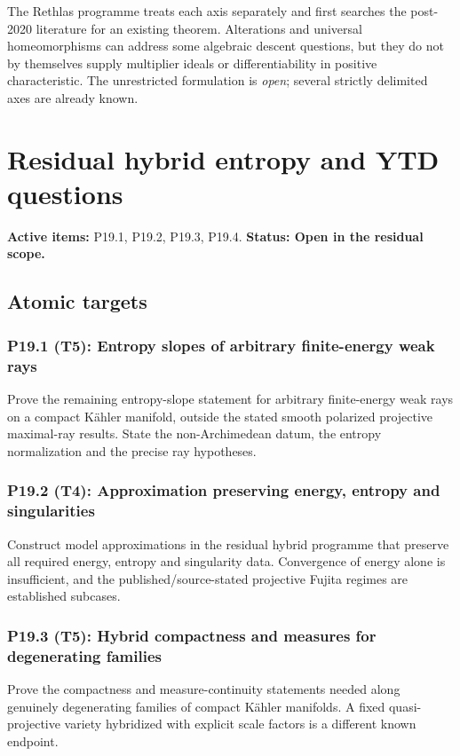 \documentclass[11pt,a4paper]{article}
\theoremstyle{definition}
\theoremstyle{remark}
\begin{document}
The Rethlas programme treats each axis separately and first searches the
post-2020 literature for an existing theorem.  Alterations and universal
homeomorphisms can address some algebraic descent questions, but they do not
by themselves supply multiplier ideals or differentiability in positive
characteristic.  The unrestricted formulation is \emph{open}; several
strictly delimited axes are already known.

\clearpage\section{Residual hybrid entropy and YTD questions}
\label{family:11}
\noindent\textbf{Active items:} P19.1, P19.2, P19.3, P19.4. \textbf{Status: Open in the residual scope.}

\subsection{Atomic targets}
\subsubsection*{P19.1 (T5): Entropy slopes of arbitrary finite-energy weak rays}
\label{atom:P19.1}
Prove the remaining entropy-slope statement for arbitrary finite-energy weak rays on a compact K\"ahler manifold, outside the stated smooth polarized projective maximal-ray results. State the non-Archimedean datum, the entropy normalization and the precise ray hypotheses.

\subsubsection*{P19.2 (T4): Approximation preserving energy, entropy and singularities}
\label{atom:P19.2}
Construct model approximations in the residual hybrid programme that preserve all required energy, entropy and singularity data. Convergence of energy alone is insufficient, and the published/source-stated projective Fujita regimes are established subcases.

\subsubsection*{P19.3 (T5): Hybrid compactness and measures for degenerating families}
\label{atom:P19.3}
Prove the compactness and measure-continuity statements needed along genuinely degenerating families of compact K\"ahler manifolds. A fixed quasi-projective variety hybridized with explicit scale factors is a different known endpoint.
\end{document}
